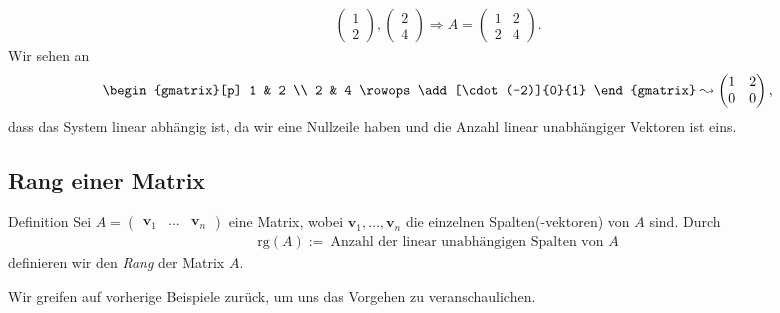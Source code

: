 \begin{align*}
\begin{pmatrix}
1 \\2
\end{pmatrix},
\begin{pmatrix}
2 \\ 4
\end{pmatrix}
\Rightarrow
A = \begin{pmatrix}
1 & 2 \\
2 & 4
\end{pmatrix}.
\end{align*}
Wir sehen an
\begin{align*}
\begin{gmatrix}[p]
1 & 2 \\
2 & 4
\rowops
\add[\cdot (-2)]{0}{1}
\end{gmatrix}
\leadsto
\begin{pmatrix}
1 & 2 \\
0 & 0
\end{pmatrix},
\end{align*}
dass das System linear abhängig ist, da wir eine Nullzeile haben und die Anzahl linear unabhängiger Vektoren ist eins.

\newpage
\subsection{Rang einer Matrix}
\begin{mybox}{Definition}
Sei $A = \begin{pmatrix}
\textbf{v}_1 & \dots & \textbf{v}_n
\end{pmatrix}$ eine Matrix, wobei $\textbf{v}_1, \dots, \textbf{v}_n$ die einzelnen Spalten(-vektoren) von $A$ sind.
Durch
\begin{align*}
\mathrm{rg}(A) := \ \text{Anzahl der linear unabhängigen Spalten von } A
\end{align*}
definieren wir den \textit{Rang} der Matrix $A$.
\end{mybox}
Wir greifen auf vorherige Beispiele zurück, um uns das Vorgehen zu veranschaulichen.\\


